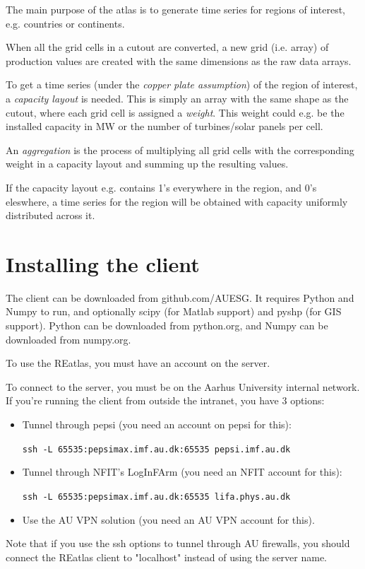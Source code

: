 \documentclass[a4paper,10pt]{article}
\begin{document}
The main purpose of the atlas is to generate time series
for regions of interest, e.g. countries or continents.

When all the grid cells in a cutout are converted,
a new grid (i.e. array) of production values are created
with the same dimensions as the raw data arrays.

To get a time series (under the \emph{copper plate assumption})
of the region of interest, a \emph{capacity layout} is needed.
This is simply an array with the same shape as the
cutout, where each grid cell is assigned a \emph{weight}.
This weight could e.g. be the installed capacity in MW or the number
of turbines/solar panels per cell.

An \emph{aggregation} is the process of multiplying all grid cells
with the corresponding weight in a capacity layout and summing up
the resulting values.

If the capacity layout e.g. contains 1's everywhere in the region,
and 0's eleswhere, a time series for the region will be obtained
with capacity uniformly distributed across it.

\section{Installing the client}

The client can be downloaded from github.com/AUESG.
It requires Python and Numpy to run, and optionally scipy (for Matlab support)
and pyshp (for GIS support). Python can be downloaded from python.org,
and Numpy can be downloaded from numpy.org.

To use the REatlas, you must have an account on the server.

To connect to the server, you must be on the Aarhus University
internal network. If you're running the client from outside
the intranet, you have 3 options:

\begin{itemize}
     \item Tunnel through pepsi (you need an account on pepsi for this):

          \verb+ssh -L 65535:pepsimax.imf.au.dk:65535 pepsi.imf.au.dk+
     \item Tunnel through NFIT's LogInFArm (you need an NFIT account for this):

          \verb+ssh -L 65535:pepsimax.imf.au.dk:65535 lifa.phys.au.dk+
     \item Use the AU VPN solution (you need an AU VPN account for this).

\end{itemize}
Note that if you use the ssh options to tunnel through AU firewalls,
you should connect the REatlas client to "localhost" instead of using
the server name.
\end{document}
